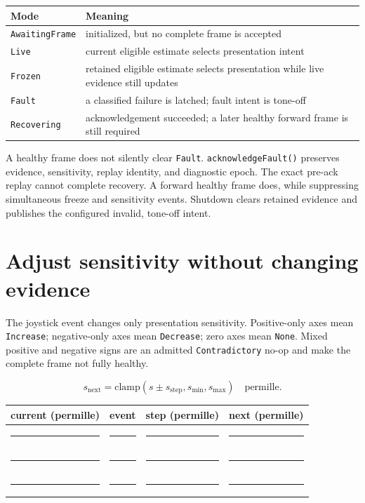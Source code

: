 \documentclass[11pt]{article}
\newcommand{\blankline}{\rule{0.86in}{0.4pt}}
\begin{document}
\begin{tabularx}{\linewidth}{@{}l X@{}}
\toprule
Mode & Meaning\\
\midrule
\texttt{AwaitingFrame} & initialized, but no complete frame is accepted\\
\texttt{Live} & current eligible estimate selects presentation intent\\
\texttt{Frozen} & retained eligible estimate selects presentation while live
evidence still updates\\
\texttt{Fault} & a classified failure is latched; fault intent is tone-off\\
\texttt{Recovering} & acknowledgement succeeded; a later healthy forward frame
is still required\\
\bottomrule
\end{tabularx}

A healthy frame does not silently clear \texttt{Fault}.
\texttt{acknowledgeFault()} preserves evidence, sensitivity, replay identity,
and diagnostic epoch. The exact pre-ack replay cannot complete recovery.
A forward healthy frame does, while suppressing simultaneous freeze and
sensitivity events. Shutdown clears retained evidence and publishes the
configured invalid, tone-off intent.

\newpage
\section{Adjust sensitivity without changing evidence}
The joystick event changes only presentation sensitivity. Positive-only axes
mean \texttt{Increase}; negative-only axes mean \texttt{Decrease}; zero axes
mean \texttt{None}. Mixed positive and negative signs are an admitted
\texttt{Contradictory} no-op and make the complete frame not fully healthy.

\[
 s_{\mathrm{next}} =
 \mathrm{clamp}(s \mathbin{\pm} s_{\mathrm{step}},
 s_{\min},s_{\max})\quad\mathrm{permille}.
\]

\begin{tabularx}{\linewidth}{@{}X X X X@{}}
\toprule
current (permille) & event & step (permille) & next (permille)\\
\midrule
\rule{0pt}{16pt}\blankline & \blankline & \blankline & \blankline\\[9pt]
\blankline & \blankline & \blankline & \blankline\\[9pt]
\blankline & \blankline & \blankline & \blankline\\
\bottomrule
\end{tabularx}
\end{document}
